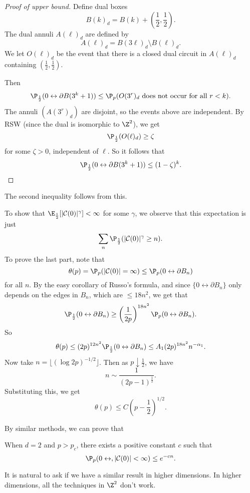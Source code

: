 \documentclass[a4paper]{article}
\begin{document}
\begin{proof}[Proof of upper bound]
  Define dual boxes
  \[
    B(k)_d = B(k) + \left(\frac{1}{2}, \frac{1}{2}\right).
  \]
  The dual annuli $A(\ell)_d$ are defined by
  \[
    A(\ell)_d = B(3\ell)_d \setminus B(\ell)_d.
  \]
  We let $O(\ell)_d$ be the event that there is a closed dual circuit in $A(\ell)_d$ containing $\left(\frac{1}{2}, \frac{1}{2}\right)$.

  Then
  \[
    \P_{\frac{1}{2}} (0 \leftrightarrow \partial B(3^k + 1)) \leq \P_p(O(3^r)_d\text{ does not occur for all }r < k).
  \]
  The annuli $(A(3^r)_d)$ are disjoint, so the events above are independent. By RSW (since the dual is isomorphic to $\Z^2$), we get
  \[
    \P_{\frac{1}{2}}(O(\ell)_d) \geq \zeta
  \]
  for some $\zeta > 0$, independent of $\ell$. So it follows that
  \[
    \P_{\frac{1}{2}}(0 \leftrightarrow \partial B(3^k + 1)) \leq (1 - \zeta)^k.\qedhere
  \]
\end{proof}

The second inequality follows from this.

To show that $\E_{\frac{1}{2}}[|\mathcal{C}(0)|^\gamma] < \infty$ for some $\gamma$, we observe that this expectation is just
\[
  \sum_n \P_{\frac{1}{2}}(|\mathcal{C}(0)|^\gamma \geq n).
\]
To prove the last part, note that
\[
  \theta(p) = \P_p(|\mathcal{C}(0)| = \infty) \leq \P_p(0 \leftrightarrow \partial B_n)
\]
for all $n$. By the easy corollary of Russo's formula, and since $\{0 \leftrightarrow \partial B_n\}$ only depends on the edges in $B_n$, which are $\leq 18 n^2$, we get that
\[
  \P_{\frac{1}{2}}(0 \leftrightarrow \partial B_n) \geq \left(\frac{1}{2p}\right)^{18n^2}\P_p(0 \leftrightarrow \partial B_n).
\]
So
\[
  \theta(p) \leq (2p)^{12n^2} \P_{\frac{1}{2}}(0 \leftrightarrow \partial B_n)  \leq A_1 (2p)^{18n^2} n^{-\alpha_1}.
\]
Now take $n = \lfloor (\log 2p)^{-1/2} \rfloor $. Then as $p \downarrow \frac{1}{2}$, we have
\[
  n \sim \frac{1}{(2p - 1)^{\frac{1}{2}}}.
\]
Substituting this, we get
\[
  \theta(p) \leq C \left(p - \frac{1}{2}\right)^{1/2}.
\]

By similar methods, we can prove that
\begin{thm}
  When $d = 2$ and $p > p_c$, there exists a positive constant $c$ such that
  \[
    \P_p(0 \leftrightarrow, |\mathcal{C}(0)| < \infty) \leq e^{-cn}.
  \]
\end{thm}

It is natural to ask if we have a similar result in higher dimensions. In higher dimensions, all the techniques in $\Z^2$ don't work.
\end{document}
